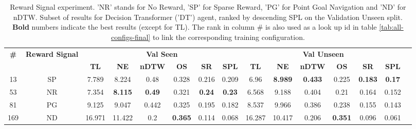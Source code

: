 \begin{table}
\centering
\caption{\label{tab:dt_reward_type}Reward Signal experiment. ’NR’ stands for No Reward, ’SP’ for Sparse Reward, ’PG’ for Point Goal Navigation and ’ND’ for nDTW. Subset of results for Decision Transformer ('DT') agent, ranked by descending SPL on the Validation Unseen split. \textbf{Bold} numbers indicate the best results (except for TL). The rank in column \# is also used as a look up id in table \ref{tab:all-configs-final} to link the corresponding training configuration.}
\begin{tabular}{@{\hskip3pt}c@{\hskip3pt}c@{\hskip3pt}c@{\hskip3pt}c@{\hskip3pt}c@{\hskip3pt}c@{\hskip3pt}c@{\hskip3pt}c@{\hskip3pt}c@{\hskip3pt}c@{\hskip3pt}c@{\hskip3pt}c@{\hskip3pt}c@{\hskip3pt}c@{\hskip3pt}c}
\toprule
                                  \textbf{\#} & \textbf{Reward Signal} & \multicolumn{6}{c}{\textbf{Val Seen}} & \multicolumn{6}{c}{\textbf{Val Unseen}} \\
\cmidrule(l){3-8}\cmidrule(l){9-14}\textbf{~} &             \textbf{~} &       \textbf{TL} &     \textbf{NE} &  \textbf{nDTW} &     \textbf{OS} &    \textbf{SR} &   \textbf{SPL} &         \textbf{TL} &     \textbf{NE} &   \textbf{nDTW} &     \textbf{OS} &     \textbf{SR} &   \textbf{SPL} \\
\midrule
                                           13 &                     SP &             7.789 &           8.224 &           0.48 &           0.328 &          0.216 &          0.209 &                6.96 &  \textbf{8.989} &  \textbf{0.433} &           0.225 &  \textbf{0.183} &  \textbf{0.17} \\
                                           53 &                     NR &             7.354 &  \textbf{8.115} &  \textbf{0.49} &           0.321 &  \textbf{0.24} &  \textbf{0.23} &               6.568 &           9.188 &           0.404 &            0.21 &           0.164 &          0.152 \\
                                           81 &                     PG &             9.125 &           9.047 &          0.442 &           0.325 &          0.195 &          0.182 &               8.537 &           9.966 &           0.386 &           0.238 &           0.155 &          0.143 \\
                                          169 &                     ND &            16.971 &          11.422 &            0.2 &  \textbf{0.365} &          0.114 &          0.068 &              16.287 &          10.417 &           0.206 &  \textbf{0.351} &           0.096 &          0.061 \\
\bottomrule
\end{tabular}
\end{table}
